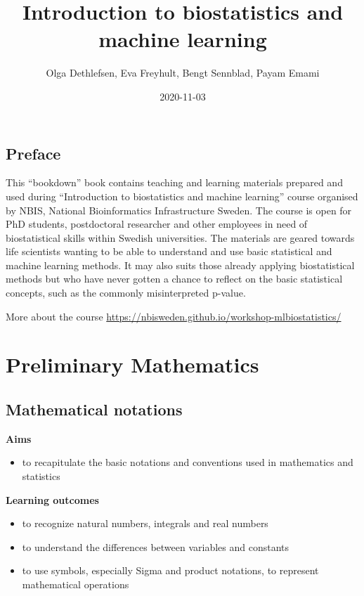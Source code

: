 \documentclass[
]{book}
\title{Introduction to biostatistics and machine learning}
\author{Olga Dethlefsen, Eva Freyhult, Bengt Sennblad, Payam Emami}
\date{2020-11-03}
\providecommand{\tightlist}{%
  \setlength{\itemsep}{0pt}\setlength{\parskip}{0pt}}
\theoremstyle{definition}
\theoremstyle{definition}
\theoremstyle{definition}
\theoremstyle{remark}
\begin{document}
\maketitle

{
\setcounter{tocdepth}{1}
\tableofcontents
}
\hypertarget{preface}{%
\chapter*{Preface}\label{preface}}

This ``bookdown'' book contains teaching and learning materials prepared and used during ``Introduction to biostatistics and machine learning'' course organised by NBIS, National Bioinformatics Infrastructure Sweden. The course is open for PhD students, postdoctoral researcher and other employees in need of biostatistical skills within Swedish universities. The materials are geared towards life scientists wanting to be able to understand and use basic statistical and machine learning methods. It may also suits those already applying biostatistical methods but who have never gotten a chance to reflect on the basic statistical concepts, such as the commonly misinterpreted p-value.

More about the course \url{https://nbisweden.github.io/workshop-mlbiostatistics/}

\hypertarget{part-preliminary-mathematics}{%
\part{Preliminary Mathematics}\label{part-preliminary-mathematics}}

\hypertarget{mathematical-notations}{%
\chapter{Mathematical notations}\label{mathematical-notations}}

\textbf{Aims}

\begin{itemize}
\tightlist
\item
  to recapitulate the basic notations and conventions used in mathematics and statistics
\end{itemize}

\textbf{Learning outcomes}

\begin{itemize}
\tightlist
\item
  to recognize natural numbers, integrals and real numbers
\item
  to understand the differences between variables and constants
\item
  to use symbols, especially Sigma and product notations, to represent mathematical operations
\end{itemize}
\end{document}
